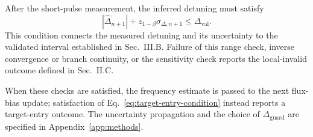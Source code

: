After the short-pulse measurement, the inferred detuning must satisfy
%
\begin{equation}
|\widehat\Delta_{n+1}|
+
z_{1-\beta}\sigma_{\Delta,n+1}
\leq
\Delta_{\mathrm{val}}.
\label{eq:track-range-condition}
\end{equation}
%
This condition connects the measured detuning and its uncertainty to the
validated interval established in Sec.~III.B. Failure of this range check,
inverse convergence or branch continuity, or the sensitivity check reports
the local-invalid outcome defined in Sec.~II.C.




When these checks are satisfied, the frequency estimate is passed to the next
flux-bias update; satisfaction of
Eq.~\eqref{eq:target-entry-condition} instead reports a target-entry outcome.
The uncertainty propagation and the choice of
$\Delta_{\mathrm{guard}}$ are specified in
Appendix~\ref{app:methods}.

